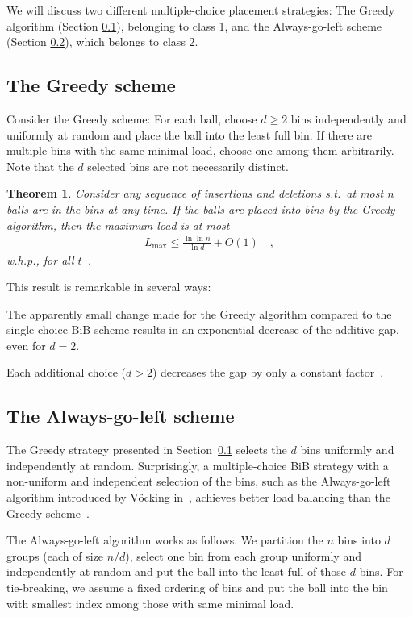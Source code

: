 \documentclass[a4paper,12pt]{article}
\newcommand\load{L_{\mathrm{max}}}
\newtheorem{theorem}{Theorem}
\begin{document}
We will discuss two different multiple-choice placement strategies: The Greedy algorithm (Section \ref{sec:greedy}), belonging to class 1, and the Always-go-left scheme (Section \ref{sec:AlwaysGoLeft}), which belongs to class 2.

\subsection{The Greedy scheme}
\label{sec:greedy}
Consider the Greedy scheme: For each ball, choose $d \geq 2$ bins independently and uniformly at random and place the ball into the least full bin. If there are multiple bins with the same minimal load, choose one among them arbitrarily. Note that the $d$ selected bins are not necessarily distinct. 

\begin{theorem}
\label{theorem:greedy}
Consider any sequence of insertions and deletions s.t.~at most $n$ balls are in the bins at any time. If the balls are placed into bins by the Greedy algorithm, then the maximum load is at most
\begin{align*}
\load \leq \frac{\ln \ln n}{\ln d}+ O(1) \quad ,
\end{align*}
w.h.p., for all $t$~\cite{ABKU99, BCSV06}.
\end{theorem}
This result is remarkable in several ways:
\begin{compactitem}
\item The apparently small change made for the Greedy algorithm compared to the single-choice BiB scheme results in an exponential decrease of the additive gap, even for $d=2$. 
\item Each additional choice ($d > 2$) decreases the gap by only a constant factor~\cite{MRS01}.
\end{compactitem}

\subsection{The Always-go-left scheme}
\label{sec:AlwaysGoLeft}
The Greedy strategy presented in Section~\ref{sec:greedy} selects the $d$ bins uniformly and independently at random. Surprisingly, a multiple-choice BiB strategy with a non-uniform and independent selection of the bins, such as the Always-go-left algorithm introduced by V\"ocking in~\cite{VOC03}, achieves better load balancing than the Greedy scheme~\cite{BCSV06}.

The Always-go-left algorithm works as follows. We partition the $n$ bins into $d$ groups (each of size $n/d$), select one bin from each group uniformly and independently at random and put the ball into the least full of those $d$ bins. For tie-breaking, we assume a fixed ordering of bins and put the ball into the bin with smallest index among those with same minimal load.
\end{document}
